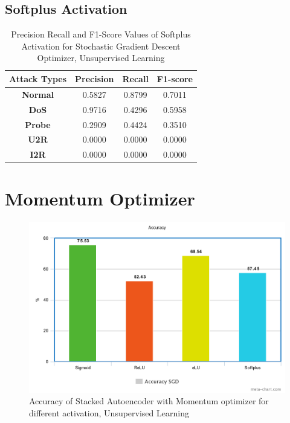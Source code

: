 \documentclass[12pt, a4paper]{report}
\begin{document}
\begin{appendices}
   \subsection{Softplus Activation}
  \begin{table}[h]
		\centering
		\captionsetup{justification=centering,margin=2cm}
		\begin{tabular}{|c|c|c|c|}
		\hline
		\textbf{Attack Types} & \textbf{Precision} & \textbf{Recall} & \textbf{F1-score} \\ \hline
		\textbf{Normal}       & 0.5827             & 0.8799          & 0.7011            \\ \hline
		\textbf{DoS}          & 0.9716             & 0.4296          & 0.5958            \\ \hline
		\textbf{Probe}        & 0.2909             & 0.4424          & 0.3510            \\ \hline
		\textbf{U2R}          & 0.0000             & 0.0000          & 0.0000            \\ \hline
		\textbf{I2R}          & 0.0000             & 0.0000          & 0.0000            \\ \hline
		\end{tabular}
		\caption{Precision Recall and F1-Score Values of Softplus Activation for Stochastic Gradient Descent Optimizer, Unsupervised Learning}
		\label{classification softplus sgd tf}
		\end{table} 



\section{Momentum Optimizer}
\begin{figure}[ht]
	\centering
	\captionsetup{justification=centering,margin=2cm}
	\includegraphics[width=13cm]{SGD_accuracy_tensorflow.png}
	\caption{ Accuracy of Stacked Autoencoder with Momentum optimizer for different activation, Unsupervised Learning }
	\label{fig:acc_sgd_tf}
	\end{figure}
	\clearpage
 

\end{appendices}
\end{document}
